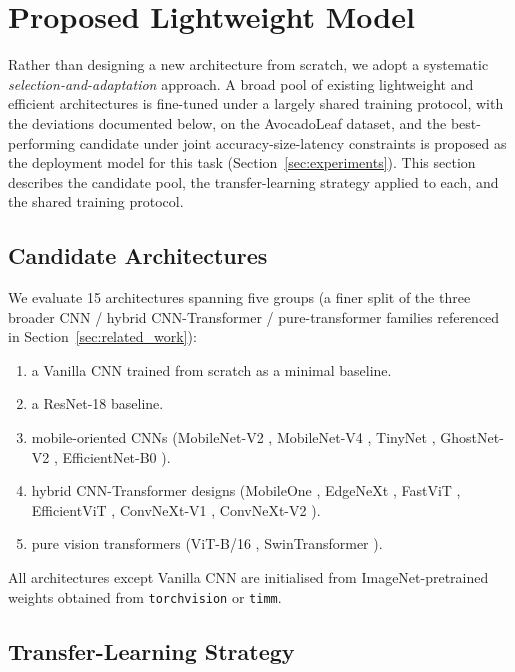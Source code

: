 \section{Proposed Lightweight Model}
\label{sec:proposed_model}

Rather than designing a new architecture from scratch, we adopt a systematic \emph{selection-and-adaptation} approach. A broad pool of existing lightweight and efficient architectures is fine-tuned under a largely shared training protocol, with the deviations documented below, on the AvocadoLeaf dataset, and the best-performing candidate under joint accuracy-size-latency constraints is proposed as the deployment model for this task (Section~\ref{sec:experiments}). This section describes the candidate pool, the transfer-learning strategy applied to each, and the shared training protocol.

\subsection{Candidate Architectures}

We evaluate 15 architectures spanning five groups (a finer split of the three broader CNN / hybrid CNN-Transformer / pure-transformer families referenced in Section~\ref{sec:related_work}):
\begin{enumerate}
    \item[(1)] a Vanilla CNN trained from scratch as a minimal baseline.
    \item[(2)] a ResNet-18 \citep{he2016deep} baseline.
    \item[(3)] mobile-oriented CNNs (MobileNet-V2 \citep{sandler2018mobilenetv2}, MobileNet-V4 \citep{qin2024mobilenetv4}, TinyNet \citep{han2020tinynet}, GhostNet-V2 \citep{tang2022ghostnetv2}, EfficientNet-B0 \citep{tan2019efficientnet}).
    \item[(4)] hybrid CNN-Transformer designs (MobileOne \citep{vasu2023mobileone}, EdgeNeXt \citep{maaz2022edgenext}, FastViT \citep{vasu2023fastvit}, EfficientViT \citep{liu2023efficientvit}, ConvNeXt-V1 \citep{liu2022convnet}, ConvNeXt-V2 \citep{woo2023convnextv2}).
    \item[(5)] pure vision transformers (ViT-B/16 \citep{dosovitskiy2021vit}, SwinTransformer \citep{liu2021swin}).
\end{enumerate}
All architectures except Vanilla CNN are initialised from ImageNet-pretrained weights obtained from \texttt{torchvision} or \texttt{timm}.

\subsection{Transfer-Learning Strategy}

